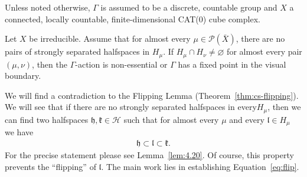 Unless noted otherwise, \(\Gamma\) is assumed to be a discrete, countable group and \(X\) a connected, locally countable, finite-dimensional CAT(0) cube complex.



\begin{prop}[{\cite[Corollary~4.21]{MR3509968}}]
  \label{prop:4.21}
  Let \(X\) be irreducible. Assume that for almost every \(\mu \in \mathcal{P}(\bar X)\), there are no pairs of strongly separated halfspaces in \(H_\mu\). If \(H_\mu \cap H_\nu \neq \varnothing\) for almost every pair \((\mu, \nu)\), then the \(\Gamma\)-action is non-essential or \(\Gamma\) has a fixed point in the visual boundary.
\end{prop}

We will find a contradiction to the Flipping Lemma (Theorem~\ref{thm:cs-flipping}). We will see that if there are no strongly separated halfspaces in every\(H_\mu\), then we can find two halfspaces \(\mathfrak{h}, \mathfrak{k} \in \mathcal{H}\) such that for almost every \(\mu\) and every \(\mathfrak{l} \in H_\mu\) we have
\begin{align}
  \mathfrak{h} \subset \mathfrak{l} \subset \mathfrak{k}.\label{eq:flip}
\end{align}
For the precise statement please see Lemma~\ref{lem:4.20}. Of course, this property prevents the \enquote{flipping} of \(\mathfrak{l}\). The main work lies in establishing Equation~\eqref{eq:flip}.

